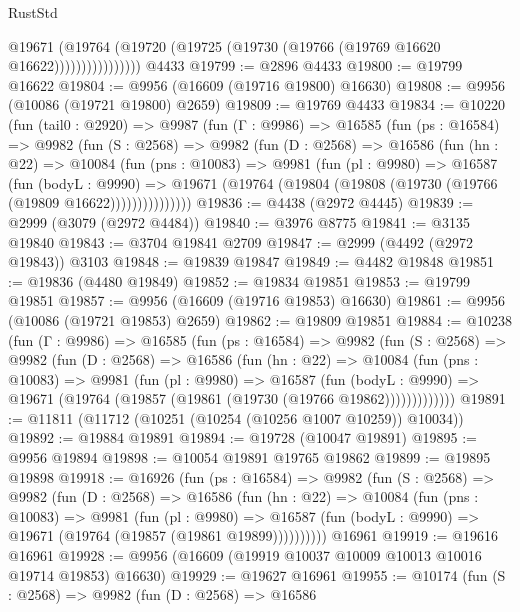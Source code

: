 \begin{lexlean}{RustStd}
\begin{coremodule}
                      @19671
                        (@19764
                          (@19720 (@19725 (@19730 (@19766 (@19769 @16620 @16622))))))))))))))))
    @4433
@19799 := @2896 @4433
@19800 := @19799 @16622
@19804 := @9956 (@16609 (@19716 @19800) @16630)
@19808 := @9956 (@10086 (@19721 @19800) @2659)
@19809 := @19769 @4433
@19834 := @10220
    (fun (tail0 : @2920) =>
    @9987
      (fun (Γ : @9986) =>
      @16585
        (fun (ps : @16584) =>
        @9982
          (fun (S : @2568) =>
          @9982
            (fun (D : @2568) =>
            @16586
              (fun (hn : @22) =>
              @10084
                (fun (pns : @10083) =>
                @9981
                  (fun (pl : @9980) =>
                  @16587
                    (fun (bodyL : @9990) =>
                    @19671 (@19764 (@19804 (@19808 (@19730 (@19766 (@19809 @16622)))))))))))))))
@19836 := @4438 (@2972 @4445)
@19839 := @2999 (@3079 (@2972 @4484))
@19840 := @3976 @8775
@19841 := @3135 @19840
@19843 := @3704 @19841 @2709
@19847 := @2999 (@4492 (@2972 @19843)) @3103
@19848 := @19839 @19847
@19849 := @4482 @19848
@19851 := @19836 (@4480 @19849)
@19852 := @19834 @19851
@19853 := @19799 @19851
@19857 := @9956 (@16609 (@19716 @19853) @16630)
@19861 := @9956 (@10086 (@19721 @19853) @2659)
@19862 := @19809 @19851
@19884 := @10238
    (fun (Γ : @9986) =>
    @16585
      (fun (ps : @16584) =>
      @9982
        (fun (S : @2568) =>
        @9982
          (fun (D : @2568) =>
          @16586
            (fun (hn : @22) =>
            @10084
              (fun (pns : @10083) =>
              @9981
                (fun (pl : @9980) =>
                @16587
                  (fun (bodyL : @9990) =>
                  @19671 (@19764 (@19857 (@19861 (@19730 (@19766 @19862)))))))))))))
@19891 := @11811 (@11712 (@10251 (@10254 (@10256 @1007 @10259)) @10034))
@19892 := @19884 @19891
@19894 := @19728 (@10047 @19891)
@19895 := @9956 @19894
@19898 := @10054 @19891 @19765 @19862
@19899 := @19895 @19898
@19918 := @16926
    (fun (ps : @16584) =>
    @9982
      (fun (S : @2568) =>
      @9982
        (fun (D : @2568) =>
        @16586
          (fun (hn : @22) =>
          @10084
            (fun (pns : @10083) =>
            @9981
              (fun (pl : @9980) =>
              @16587 (fun (bodyL : @9990) => @19671 (@19764 (@19857 (@19861 @19899))))))))))
    @16961
@19919 := @19616 @16961
@19928 := @9956 (@16609 (@19919 @10037 @10009 @10013 @10016 @19714 @19853) @16630)
@19929 := @19627 @16961
@19955 := @10174
    (fun (S : @2568) =>
    @9982
      (fun (D : @2568) =>
      @16586

\end{coremodule}
\end{lexlean}
